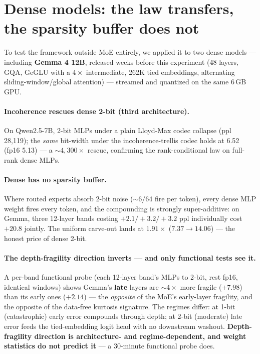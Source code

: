 \documentclass[10pt]{article}
\begin{document}
\section{Dense models: the law transfers, the sparsity buffer does not}\label{sec:dense}
To test the framework outside MoE entirely, we applied it to two dense models --- including
\textbf{Gemma 4 12B}, released weeks before this experiment (48 layers, GQA, GeGLU with a $4\times$
intermediate, 262K tied embeddings, alternating sliding-window/global attention) --- streamed and
quantized on the same 6\,GB GPU.

\paragraph{Incoherence rescues dense 2-bit (third architecture).}
On Qwen2.5-7B, 2-bit MLPs under a plain Lloyd-Max codec collapse (ppl 28{,}119); the \emph{same}
bit-width under the incoherence-trellis codec holds at 6.52 (fp16 5.13) --- a ${\sim}4{,}300\times$
rescue, confirming the rank-conditional law on full-rank dense MLPs.

\paragraph{Dense has no sparsity buffer.}
Where routed experts absorb 2-bit noise (${\sim}6/64$ fire per token), every dense MLP weight fires every
token, and the compounding is strongly super-additive: on Gemma, three 12-layer bands costing
$+2.1/+3.2/+3.2$ ppl individually cost $\mathbf{+20.8}$ jointly. The uniform carve-out lands at
$\mathbf{1.91\times}$ ($7.37\to14.06$) --- the honest price of dense 2-bit.

\paragraph{The depth-fragility direction inverts --- and only functional tests see it.}
A per-band functional probe (each 12-layer band's MLPs to 2-bit, rest fp16, identical windows) shows
Gemma's \textbf{late} layers are ${\sim}4\times$ more fragile ($+7.98$) than its early ones ($+2.14$) ---
the \emph{opposite} of the MoE's early-layer fragility, and the opposite of the data-free kurtosis
signature. The regimes differ: at 1-bit (catastrophic) early error compounds through depth; at 2-bit
(moderate) late error feeds the tied-embedding logit head with no downstream washout.
\textbf{Depth-fragility direction is architecture- and regime-dependent, and weight statistics do not
predict it} --- a 30-minute functional probe does.
\end{document}
